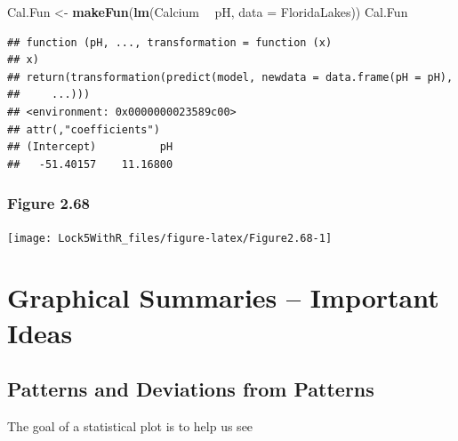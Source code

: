 \documentclass[]{book}
\newenvironment{Shaded}{\begin{snugshade}}{\end{snugshade}}
\newcommand{\DataTypeTok}[1]{\textcolor[rgb]{0.13,0.29,0.53}{#1}}
\newcommand{\KeywordTok}[1]{\textcolor[rgb]{0.13,0.29,0.53}{\textbf{#1}}}
\newcommand{\NormalTok}[1]{#1}
\newcommand{\OperatorTok}[1]{\textcolor[rgb]{0.81,0.36,0.00}{\textbf{#1}}}
\newcommand{\StringTok}[1]{\textcolor[rgb]{0.31,0.60,0.02}{#1}}
\begin{document}
\begin{Shaded}
\begin{Highlighting}[]
\NormalTok{Cal.Fun <-}\StringTok{ }\KeywordTok{makeFun}\NormalTok{(}\KeywordTok{lm}\NormalTok{(Calcium }\OperatorTok{~}\StringTok{ }\NormalTok{pH, }\DataTypeTok{data =}\NormalTok{ FloridaLakes))}
\NormalTok{Cal.Fun}
\end{Highlighting}
\end{Shaded}

\begin{verbatim}
## function (pH, ..., transformation = function (x) 
## x) 
## return(transformation(predict(model, newdata = data.frame(pH = pH), 
##     ...)))
## <environment: 0x0000000023589c00>
## attr(,"coefficients")
## (Intercept)          pH 
##   -51.40157    11.16800
\end{verbatim}

\hypertarget{figure-2.68}{%
\subsubsection{Figure 2.68}\label{figure-2.68}}

\begin{Shaded}
\end{Shaded}

\texttt{[image: Lock5WithR\_files/figure-latex/Figure2.68-1]}

\hypertarget{graphical-summaries-important-ideas}{%
\section{Graphical Summaries -- Important Ideas}\label{graphical-summaries-important-ideas}}

\hypertarget{patterns-and-deviations-from-patterns}{%
\subsection{Patterns and Deviations from Patterns}\label{patterns-and-deviations-from-patterns}}

The goal of a statistical plot is to help us see
\end{document}

